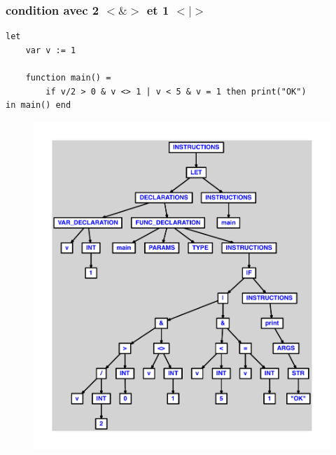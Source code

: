 \documentclass{article}
\begin{document}
\subsubsection{condition avec 2 $ < $$ \& $$ > $ et 1 $ < $$ | $$ > $}
\begin{lstlisting}
let
	var v := 1

	function main() =
		if v/2 > 0 & v <> 1 | v < 5 & v = 1 then print("OK")
in main() end
\end{lstlisting}
\newpage
\begin{figure}[H]
\centering
\includegraphics[max width=\textwidth]{ast/ast_4.pdf}
\end{figure}
\newpage
\end{document}
